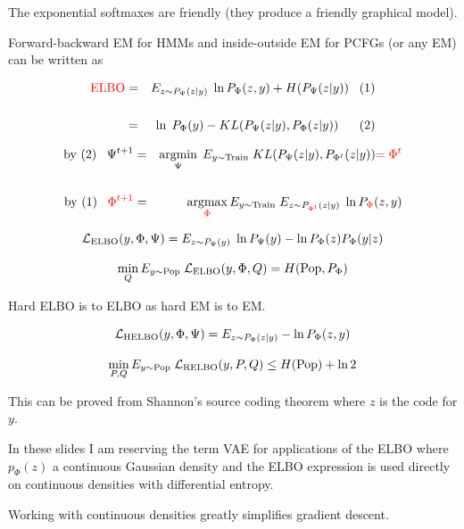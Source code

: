 {The exponential softmaxes are friendly (they produce a friendly graphical model).

Forward-backward EM for HMMs and inside-outside EM for PCFGs (or any EM) can be written as

\vfill
\begin{eqnarray*}
\mathrm{\color{red} ELBO}& = & E_{z \sim P_\Psi(z|y)}\; \ln P_\Phi(z,y) + H(P_\Psi(z|y))\;\;\;(1) \\
 \\      
  & = & \ln\;P_{\Phi}(y) - KL(P_\Psi(z|y),P_{\Phi}(z|y))\;\;\;\;\;\;(2)
\end{eqnarray*}

\vfill
\begin{eqnarray*}
\mbox{by (2)}\;\;\;\Psi^{t+1} & = & \operatorname*{argmin}_\Psi \;E_{y \sim \mathrm{Train}} \; KL(P_{\Psi}(z|y),P_{\Phi^t}(z|y)) {\color{red} = \Phi^t} \\
\\
\mbox{by (1)}\;\;\;{\color{red} \Phi^{t+1}} & = & \operatorname*{argmax}_{\color{red} \Phi} E_{y \sim \mathrm{Train}} \;E_{z \sim P_{\color{red} {\Phi^t}}(z|y)}\; \ln P_{\color{red} \Phi}(z,y)
\end{eqnarray*}


$${\cal L}_{\mathrm{ELBO}}(y,\Phi,\Psi) = E_{z\sim P_\Psi(y)} \; \ln P_\Psi(y) - \ln P_\Phi(z)P_\Phi(y|z)$$

\vfill
$$\min_Q E_{y \sim \mathrm{Pop}}\;{\cal L}_{\mathrm{ELBO}}(y,\Phi,Q) = H(\mathrm{Pop},P_\Phi)$$



Hard ELBO is to ELBO as hard EM is to EM.

\vfill
$${\cal L}_{\mathrm{HELBO}}(y,\Phi,\Psi)  = E_{z \sim P_\Phi(z|y)} - \ln P_\Phi(z,y)$$

\vfill
$$\min_{P,Q} E_{y \sim \mathrm{Pop}}\;{\cal L}_{\mathrm{RELBO}}(y,P,Q) \leq H(\mathrm{Pop}) + \ln 2$$

\vfill
This can be proved from Shannon's source coding theorem where $z$ is the code for $y$.


In these slides I am reserving the term VAE for applications of the ELBO where $p_\Phi(z)$ a continuous Gaussian density
and the ELBO expression is used directly on continuous densities with differential entropy.

\vfill
Working with continuous densities greatly simplifies gradient descent.

}
